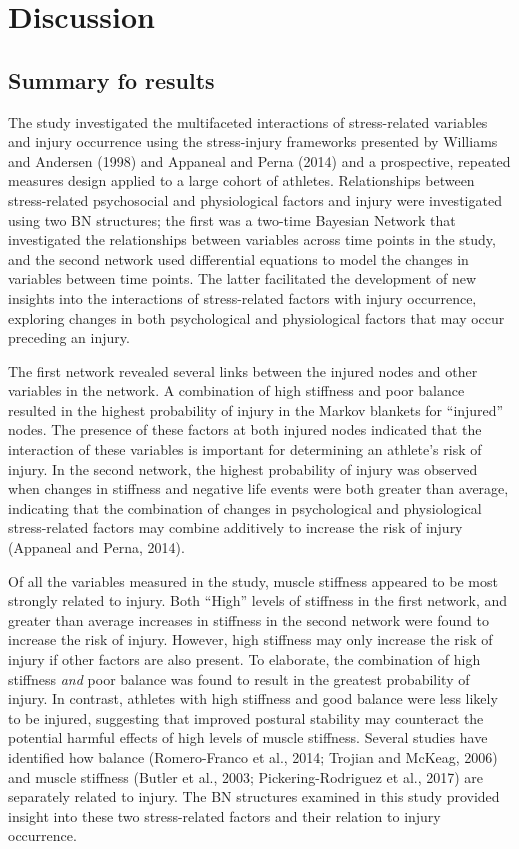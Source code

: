 \documentclass[
  english,
  man,floatsintext]{apa6}
\begin{document}
\hypertarget{discussion}{%
\section{Discussion}\label{discussion}}

\hypertarget{summary-fo-results}{%
\subsection{Summary fo results}\label{summary-fo-results}}

The study investigated the multifaceted interactions of stress-related variables and injury occurrence using the stress-injury frameworks presented by Williams and Andersen (1998) and Appaneal and Perna (2014) and a prospective, repeated measures design applied to a large cohort of athletes. Relationships between stress-related psychosocial and physiological factors and injury were investigated using two BN structures; the first was a two-time Bayesian Network that investigated the relationships between variables across time points in the study, and the second network used differential equations to model the changes in variables between time points.
The latter facilitated the development of new insights into the interactions of stress-related factors with injury occurrence, exploring changes in both psychological and physiological factors that may occur preceding an injury.

The first network revealed several links between the injured nodes and other variables in the network. A combination of high stiffness and poor balance resulted in the highest probability of injury in the Markov blankets for ``injured'' nodes. The presence of these factors at both injured nodes indicated that the interaction of these variables is important for determining an athlete's risk of injury. In the second network, the highest probability of injury was observed when changes in stiffness and negative life events were both greater than average, indicating that the combination of changes in psychological and physiological stress-related factors may combine additively to increase the risk of injury (Appaneal and Perna, 2014).

Of all the variables measured in the study, muscle stiffness appeared to be most strongly related to injury.
Both ``High'' levels of stiffness in the first network, and greater than average increases in stiffness in the second network were found to increase the risk of injury.
However, high stiffness may only increase the risk of injury if other factors are also present.
To elaborate, the combination of high stiffness \emph{and} poor balance was found to result in the greatest probability of injury.
In contrast, athletes with high stiffness and good balance were less likely to be injured, suggesting that improved postural stability may counteract the potential harmful effects of high levels of muscle stiffness.
Several studies have identified how balance (Romero-Franco et al., 2014; Trojian and McKeag, 2006) and muscle stiffness (Butler et al., 2003; Pickering-Rodriguez et al., 2017) are separately related to injury. The BN structures examined in this study provided insight into these two stress-related factors and their relation to injury occurrence.
\end{document}
